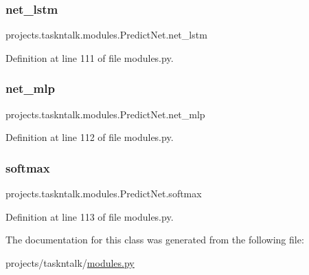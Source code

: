 \subsubsection{\texorpdfstring{net\+\_\+lstm}{net\_lstm}}
{\footnotesize\ttfamily projects.\+taskntalk.\+modules.\+Predict\+Net.\+net\+\_\+lstm}



Definition at line 111 of file modules.\+py.

\mbox{\label{classprojects_1_1taskntalk_1_1modules_1_1PredictNet_ac4f309ddfe1d817c3d345f390604322e}} 
\subsubsection{\texorpdfstring{net\+\_\+mlp}{net\_mlp}}
{\footnotesize\ttfamily projects.\+taskntalk.\+modules.\+Predict\+Net.\+net\+\_\+mlp}



Definition at line 112 of file modules.\+py.

\mbox{\label{classprojects_1_1taskntalk_1_1modules_1_1PredictNet_ade00e095f7c5b6a29284e514d7aaaf44}} 
\subsubsection{\texorpdfstring{softmax}{softmax}}
{\footnotesize\ttfamily projects.\+taskntalk.\+modules.\+Predict\+Net.\+softmax}



Definition at line 113 of file modules.\+py.



The documentation for this class was generated from the following file\+:\begin{DoxyCompactItemize}
\item 
projects/taskntalk/\hyperlink{projects_2taskntalk_2modules_8py}{modules.\+py}\end{DoxyCompactItemize}
